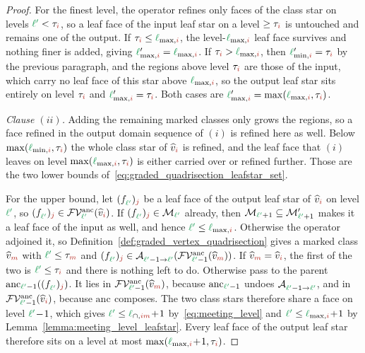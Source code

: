 \documentclass[a4paper, 12pt]{article}
\newcommand{\lminIdx}[1]{\l_{\min,#1}}
\newcommand{\lmaxIdx}[1]{\l_{\max,#1}}
\newcommand{\lmeetIdx}[2]{\l_{\cap,#1#2}}
\newcommand{\targetlevel}{\tau}                                 %
\newcommand{\green}{\color{ForestGreen}}
\newcommand{\brickred}{\color{BrickRed}}
\newcommand{\V}{\mathcal{V}}
\newcommand{\F}{\mathcal{F}}
\newcommand{\vertexClass}[1]{\widehat{v}_{#1}}
\newcommand{\face}[2]{\freeQ{f}{}{#1}{#2}}
\newcommand{\coarseIdxone}{{\brickred i}}
\newcommand{\coarseIdxtwo}{{\brickred m}}
\newcommand{\fineIdxone}{{\brickred j}}
\renewcommand{\l}{{\green\ell}}
\newcommand{\lone}{{\green {\l'}  }}
\newcommand{\freeQ}[4]{ ( {#1}^{#2}_{#3} )_{#4}}
\newcommand{\Aop}[3]{\mathcal{A}^{#1}_{{#2} \to {#3}}}
\newcommand{\M}{\mathcal{M}}
\theoremstyle{definition}
\theoremstyle{plain}
\numberwithin{equation}{section}
\newcommand{\anc}[1]{\mathrm{anc}_{#1}}                     %
\newcommand{\FVanc}[1]{\F\V^{\mathrm{anc}}_{#1}}            %
\begin{document}
\begin{proof}
    For the finest level, the operator refines only faces of the class star on levels $\lone < \targetlevel_\coarseIdxone$, so a leaf face of the input leaf star on a level $\geq \targetlevel_\coarseIdxone$ is untouched and remains one of the output. If $\targetlevel_\coarseIdxone \leq \lmaxIdx{\coarseIdxone}$, the level-$\lmaxIdx{\coarseIdxone}$ leaf face survives and nothing finer is added, giving $\lmaxIdx{\coarseIdxone}' = \lmaxIdx{\coarseIdxone}$. If $\targetlevel_\coarseIdxone > \lmaxIdx{\coarseIdxone}$, then $\lminIdx{\coarseIdxone}' = \targetlevel_\coarseIdxone$ by the previous paragraph, and the regions above level $\targetlevel_\coarseIdxone$ are those of the input, which carry no leaf face of this star above $\lmaxIdx{\coarseIdxone}$, so the output leaf star sits entirely on level $\targetlevel_\coarseIdxone$ and $\lmaxIdx{\coarseIdxone}' = \targetlevel_\coarseIdxone$. Both cases are $\lmaxIdx{\coarseIdxone}' = \max(\lmaxIdx{\coarseIdxone}, \targetlevel_\coarseIdxone)$.

    \emph{Clause $(ii)$.} Adding the remaining marked classes only grows the regions, so a face refined in the output domain sequence of $(i)$ is refined here as well. Below $\max(\lminIdx{\coarseIdxone}, \targetlevel_\coarseIdxone)$ the whole class star of $\vertexClass{\coarseIdxone}$ is refined, and the leaf face that $(i)$ leaves on level $\max(\lmaxIdx{\coarseIdxone}, \targetlevel_\coarseIdxone)$ is either carried over or refined further. Those are the two lower bounds of~\eqref{eq:graded_quadrisection_leafstar_set}.

    For the upper bound, let $\face{\lone}{\fineIdxone}$ be a leaf face of the output leaf star of $\vertexClass{\coarseIdxone}$ on level $\lone$, so $\face{\lone}{\fineIdxone} \in \FVanc{\lone}(\vertexClass{\coarseIdxone})$. If $\face{\lone}{\fineIdxone} \in \M_\lone$ already, then $\M_{\lone+1} \subseteq \M'_{\lone+1}$ makes it a leaf face of the input as well, and hence $\lone \leq \lmaxIdx{\coarseIdxone}$. Otherwise the operator adjoined it, so Definition~\ref{def:graded_vertex_quadrisection} gives a marked class $\vertexClass{\coarseIdxtwo}$ with $\lone \leq \targetlevel_\coarseIdxtwo$ and $\face{\lone}{\fineIdxone} \in \Aop{}{\lone-1}{\lone}(\FVanc{\lone-1}(\vertexClass{\coarseIdxtwo}))$. If $\vertexClass{\coarseIdxtwo} = \vertexClass{\coarseIdxone}$, the first of the two is $\lone \leq \targetlevel_\coarseIdxone$ and there is nothing left to do. Otherwise pass to the parent $\anc{\lone-1}(\face{\lone}{\fineIdxone})$. It lies in $\FVanc{\lone-1}(\vertexClass{\coarseIdxtwo})$, because $\anc{\lone-1}$ undoes $\Aop{}{\lone-1}{\lone}$, and in $\FVanc{\lone-1}(\vertexClass{\coarseIdxone})$, because $\anc{}$ composes. The two class stars therefore share a face on level $\lone \! - \! 1$, which gives $\lone \leq \lmeetIdx{\coarseIdxone}{\coarseIdxtwo} \! + \! 1$ by~\eqref{eq:meeting_level} and $\lone \leq \lmaxIdx{\coarseIdxone} \! + \! 1$ by Lemma~\ref{lemma:meeting_level_leafstar}. Every leaf face of the output leaf star therefore sits on a level at most $\max(\lmaxIdx{\coarseIdxone} \! + \! 1, \targetlevel_\coarseIdxone)$.


\end{proof}
\end{document}
